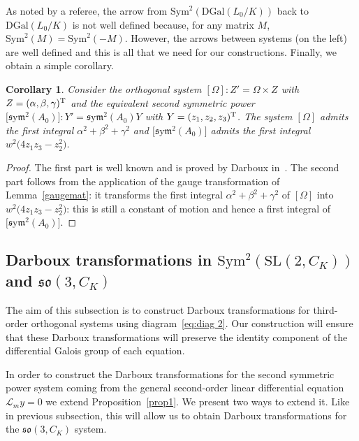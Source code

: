 \documentclass[10pt,a4paper]{amsart}
\numberwithin{equation}{section}
\newtheorem{Corollary}[Theorem]{Corollary}
\def\Sym{\mathrm{Sym}}
\def\sym{\mathfrak{s}\mathrm{y}\mathfrak{m}}
\begin{document}
As noted by a referee, the arrow from $\Sym^2 (\mathrm{DGal}(L_0/K)) $ back to $\mathrm{DGal}(L_0/K)$ is not well defined because, for any matrix $M$, $\Sym^2(M) = \Sym^2(-M)$. However, the arrows between systems (on the left) are well defined and this is all that we need for our constructions.
Finally, we obtain a simple corollary.
\begin{Corollary}%
Consider the orthogonal system $[\Omega]\colon Z' = \Omega \times Z$ with $Z = (\alpha , \beta , \gamma)^{\rm T}$ and the equivalent second symmetric power $\big[\sym^2 (A_0)\big]\colon Y' = \sym^2 (A_0) Y$ with $Y= (z_1, z_2 , z_3)^{\rm T}$. The system $[\Omega]$ admits the first integral $\alpha^2 + \beta^2 + \gamma^2$ and $\big[\sym^2 (A_0)\big]$ admits the first integral $w^2 \big(4 z_1 z_3 - z_2^2\big)$.
\end{Corollary}

\begin{proof}The first part is well known and is proved by Darboux in~\cite[Part~I, Chapter~I, p.~8 and Chapter~II, p.~28]{da3}.
The second part follows from the application of the gauge transformation of Lemma~\ref{gaugemat}: it transforms the first integral $\alpha^2 + \beta^2 + \gamma^2$ of $[\Omega]$ into $w^2 \big(4 z_1 z_3 - z_2^2\big)$:
this is still a constant of motion and hence a first integral of $\big[\sym^2 (A_0)\big]$.
\end{proof}

\subsection{Darboux transformations in \texorpdfstring{$\Sym^2(\mathrm{SL}(2,C_K))$}{Sym\string^2(SL(2,C\_K))} and \texorpdfstring{$\mathfrak{so}(3,C_K)$}{so(3,C\_K)}}

The aim of this subsection is to construct Darboux transformations for third-order orthogonal systems using diagram~\eqref{eq:diag 2}.
Our construction will ensure that these Darboux transformations will preserve the identity component of the differential Galois group of each equation.

In order to construct the Darboux transformations for the second symmetric power system coming from the general second-order linear differential equation ${\mathcal{L}}_my=0$ we extend Proposition~\ref{prop1}. We present two ways to extend it. Like in previous subsection, this will allow us to obtain Darboux transformations for the $\mathfrak{so}(3, C_K)$ system.
\end{document}
